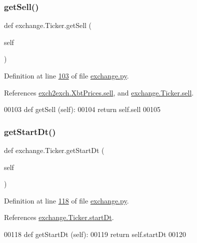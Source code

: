 \subsubsection{\texorpdfstring{get\+Sell()}{getSell()}}
{\footnotesize\ttfamily def exchange.\+Ticker.\+get\+Sell (\begin{DoxyParamCaption}\item[{}]{self }\end{DoxyParamCaption})}



Definition at line \hyperlink{exchange_8py_source_l00103}{103} of file \hyperlink{exchange_8py_source}{exchange.\+py}.



References \hyperlink{exch2exch_8py_source_l00058}{exch2exch.\+Xbt\+Prices.\+sell}, and \hyperlink{exchange_8py_source_l00061}{exchange.\+Ticker.\+sell}.


\begin{DoxyCode}
00103     \textcolor{keyword}{def }getSell (self):
00104         \textcolor{keywordflow}{return} self.sell
00105     
\end{DoxyCode}
\mbox{\label{classexchange_1_1_ticker_a70ccf798c847515b67cc474ec35e933c}} 
\subsubsection{\texorpdfstring{get\+Start\+Dt()}{getStartDt()}}
{\footnotesize\ttfamily def exchange.\+Ticker.\+get\+Start\+Dt (\begin{DoxyParamCaption}\item[{}]{self }\end{DoxyParamCaption})}



Definition at line \hyperlink{exchange_8py_source_l00118}{118} of file \hyperlink{exchange_8py_source}{exchange.\+py}.



References \hyperlink{exchange_8py_source_l00067}{exchange.\+Ticker.\+start\+Dt}.


\begin{DoxyCode}
00118     \textcolor{keyword}{def }getStartDt (self):
00119         \textcolor{keywordflow}{return} self.startDt
00120 
\end{DoxyCode}
\mbox{\label{classexchange_1_1_ticker_aaee4b5454a701e8f468ccca714e7ee59}} 
